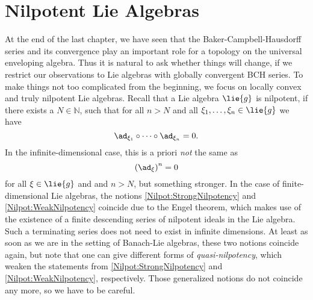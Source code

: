 
%
%

\chapter{Nilpotent Lie Algebras}

At the end of the last chapter, we have seen that the Baker-Campbell-Hausdorff 
series and its convergence play an important role for a topology on the 
universal enveloping algebra. Thus it is natural to ask whether things will 
change, if we restrict our observations to Lie algebras with globally convergent 
BCH series. To make things not too complicated from the beginning, we focus on 
locally convex and truly nilpotent Lie algebras. Recall that a Lie algebra 
$\lie{g}$ is nilpotent, if there exists a $N \in \mathbb{N}$, such that for 
all $n > N$ and all $\xi_1, \ldots, \xi_n \in \lie{g}$ we have
\begin{equation}
	\label{Nilpot:StrongNilpotency}
	\ad_{\xi_1} \circ \cdots \circ \ad_{\xi_n}
	=
	0.
\end{equation}
In the infinite-dimensional case, this is a priori \emph{not} the same as 
\begin{equation}
	\label{Nilpot:WeakNilpotency}
	\left( \ad_{\xi} \right)^n
	=
	0
\end{equation}
for all $\xi \in \lie{g}$ and and $n > N$, but something
stronger. In the case of finite-dimensional Lie algebras, the notions 
\eqref{Nilpot:StrongNilpotency} and \eqref{Nilpot:WeakNilpotency} coincide due 
to the Engel theorem, which makes use of the existence of a 
finite descending series of nilpotent ideals in the Lie algebra. Such a 
terminating series does not need to exist in infinite dimensions. At least as 
soon as we are in the setting of Banach-Lie algebras, these two notions  
coincide again, but note that one can give different forms of 
\emph{quasi-nilpotency}, which weaken the statements from 
\eqref{Nilpot:StrongNilpotency} and \eqref{Nilpot:WeakNilpotency}, respectively. 
Those generalized notions do not coincide any more, so we have to be careful.


